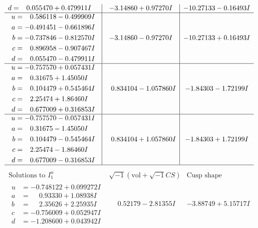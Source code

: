\documentclass[1p]{elsarticle_modified}
\theoremstyle{definition}
\newcommand{\I}{\sqrt{-1}}
\begin{document}
$$\begin{array}{c|c|c}
\begin{aligned}
d &= \phantom{-}0.055470 + 0.479911 I\end{aligned}
 & -3.14860 + 0.97270 I & -10.27133 - 0.16493 I \\ \hline\begin{aligned}
u &= \phantom{-}0.586118 - 0.499909 I \\
a &= -0.491451 - 0.661896 I \\
b &= -0.737846 - 0.812570 I \\
c &= \phantom{-}0.896958 - 0.907467 I \\
d &= \phantom{-}0.055470 - 0.479911 I\end{aligned}
 & -3.14860 - 0.97270 I & -10.27133 + 0.16493 I \\ \hline\begin{aligned}
u &= -0.757570 + 0.057431 I \\
a &= \phantom{-}0.31675 + 1.45050 I \\
b &= \phantom{-}0.104479 + 0.545464 I \\
c &= \phantom{-}2.25474 + 1.86460 I \\
d &= \phantom{-}0.677009 + 0.316853 I\end{aligned}
 & \phantom{-}0.834104 - 1.057860 I & -1.84303 - 1.72199 I \\ \hline\begin{aligned}
u &= -0.757570 - 0.057431 I \\
a &= \phantom{-}0.31675 - 1.45050 I \\
b &= \phantom{-}0.104479 - 0.545464 I \\
c &= \phantom{-}2.25474 - 1.86460 I \\
d &= \phantom{-}0.677009 - 0.316853 I\end{aligned}
 & \phantom{-}0.834104 + 1.057860 I & -1.84303 + 1.72199 I\\
 \hline 
 \end{array}$$\newpage$$\begin{array}{c|c|c}  
\text{Solutions to }I^u_{1}& \I (\text{vol} + \sqrt{-1}CS) & \text{Cusp shape}\\
 \hline 
\begin{aligned}
u &= -0.748122 + 0.099272 I \\
a &= \phantom{-}0.93330 + 1.08938 I \\
b &= \phantom{-}2.35626 + 2.25935 I \\
c &= -0.756009 + 0.052947 I \\
d &= -1.208600 + 0.043942 I\end{aligned}
 & \phantom{-}0.52179 - 2.81355 I & -3.88749 + 5.15717 I \\ \hline\begin{aligned}

\end{aligned}
\end{array}$$
\end{document}
